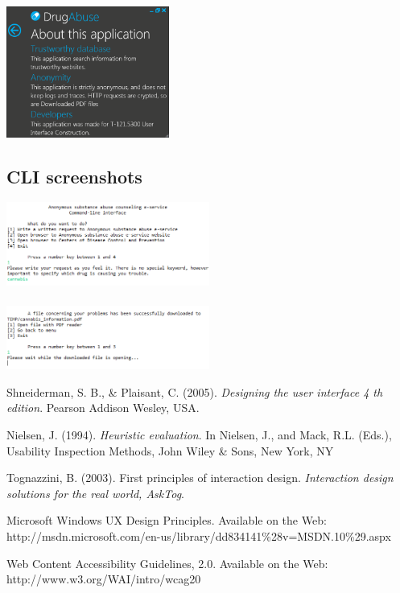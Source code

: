 \documentclass[a4paper,12pt, twocolumn]{article}
\begin{document}
\begin{center}
\includegraphics[width=0.4\textwidth]{images/desktop_screen_about.png}
\label{desktop_about}
\end{center}

\subsection{CLI screenshots}

\begin{center}
\includegraphics[width=0.5\textwidth]{images/cli_screen_1.png}
\label{cli_1}
~\\~\\

\includegraphics[width=0.5\textwidth]{images/cli_screen_2.png}
\label{cli_1}
\end{center}



\clearpage
\newpage
\begin{thebibliography}{9}

  Shneiderman, S. B., \& Plaisant, C. (2005). \emph{Designing the user interface 4 th edition}. Pearson Addison Wesley, USA.

  Nielsen, J. (1994). \emph{Heuristic evaluation}. In Nielsen, J., and Mack, R.L. (Eds.), Usability Inspection Methods, John Wiley \& Sons, New York, NY

  Tognazzini, B. (2003). First principles of interaction design. \emph{Interaction design solutions for the real world, AskTog}.
  
 Microsoft Windows UX Design Principles. Available on the Web: http://msdn.microsoft.com/en-us/library/dd834141\%28v=MSDN.10\%29.aspx

Web Content Accessibility Guidelines, 2.0. Available on the Web: http://www.w3.org/WAI/intro/wcag20

\end{thebibliography}
\end{document}
